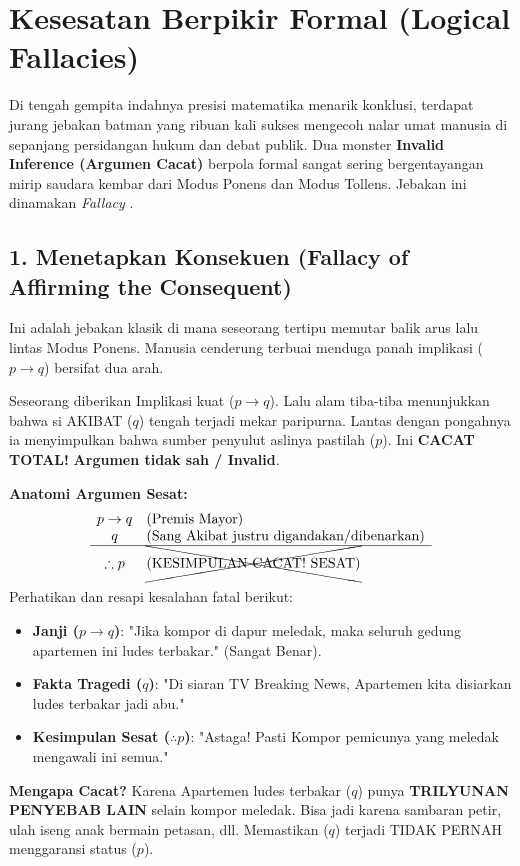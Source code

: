 \section{Kesesatan Berpikir Formal (Logical Fallacies)}

Di tengah gempita indahnya presisi matematika menarik konklusi, terdapat jurang jebakan batman yang ribuan kali sukses mengecoh nalar umat manusia di sepanjang persidangan hukum dan debat publik. Dua monster \textbf{Invalid Inference (Argumen Cacat)} berpola formal sangat sering bergentayangan mirip saudara kembar dari Modus Ponens dan Modus Tollens. Jebakan ini dinamakan \textit{Fallacy} \cite{rosen2019}.

\subsection{1. Menetapkan Konsekuen (Fallacy of Affirming the Consequent)}

Ini adalah jebakan klasik di mana seseorang tertipu memutar balik arus lalu lintas Modus Ponens. Manusia cenderung terbuai menduga panah implikasi ($p \rightarrow q$) bersifat dua arah. 

\begin{teorema}
Seseorang diberikan Implikasi kuat ($p \rightarrow q$). Lalu alam tiba-tiba menunjukkan bahwa si AKIBAT ($q$) tengah terjadi mekar paripurna. Lantas dengan pongahnya ia menyimpulkan bahwa sumber penyulut aslinya pastilah ($p$). Ini \textbf{CACAT TOTAL!} \textbf{Argumen tidak sah / Invalid}. 
\end{teorema}

\textbf{Anatomi Argumen Sesat:}
\[
\begin{array}{cl}
p \rightarrow q & \text{(Premis Mayor)} \\
q & \text{(Sang Akibat justru digandakan/dibenarkan)} \\
\hline
\therefore p & \text{\xcancel{(KESIMPULAN CACAT! SESAT)}}
\end{array}
\]

\begin{contoh}
Perhatikan dan resapi kesalahan fatal berikut:
\begin{itemize}
    \item \textbf{Janji ($p \rightarrow q$)}: "Jika kompor di dapur meledak, maka seluruh gedung apartemen ini ludes terbakar." (Sangat Benar).
    \item \textbf{Fakta Tragedi ($q$)}: "Di siaran TV Breaking News, Apartemen kita disiarkan ludes terbakar jadi abu."
    \item \textbf{Kesimpulan Sesat ($\therefore p$)}: "Astaga! Pasti Kompor pemicunya yang meledak mengawali ini semua."
\end{itemize}
\textbf{Mengapa Cacat?} Karena Apartemen ludes terbakar ($q$) punya \textbf{TRILYUNAN PENYEBAB LAIN} selain kompor meledak. Bisa jadi karena sambaran petir, ulah iseng anak bermain petasan, dll. Memastikan ($q$) terjadi TIDAK PERNAH menggaransi status ($p$).
\end{contoh}

